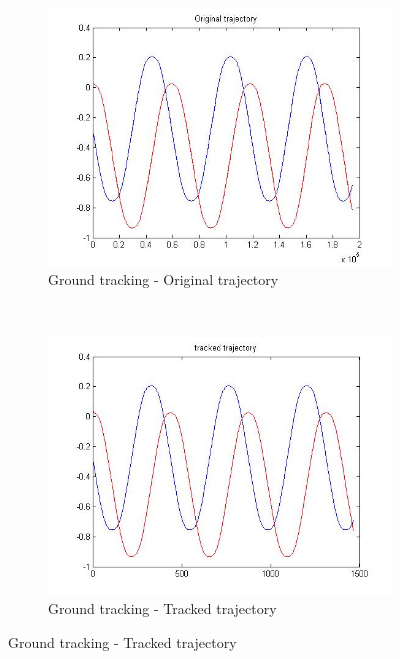 \begin{figure}[ht]
	\centering
	\begin{subfigure}[b]{0.4\linewidth}
		\centering
		\includegraphics[width=\linewidth]{../Images/c3/sim1_traj_ori}
		\caption{Ground tracking - Original trajectory}
		\label{fig:sim1_traj_ori}
	\end{subfigure}
	~
	\begin{subfigure}[b]{0.4\linewidth}
		\centering
		\includegraphics[width=\linewidth]{../Images/c3/sim1_traj_track}
		\caption{Ground tracking - Tracked trajectory}
		\label{fig:sim1_traj_track}
	\end{subfigure}

\end{figure}


